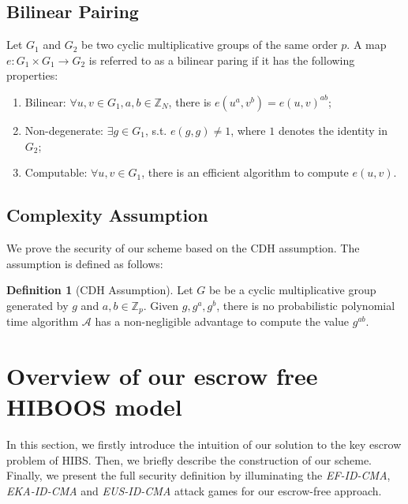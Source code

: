 \documentclass[times]{secauth}
\theoremstyle{definition}
\newtheorem{definition}[theorem]{Definition}
\theoremstyle{remark}
\begin{document}
\subsection{Bilinear Pairing}
Let $G_1$ and $G_2$ be two cyclic multiplicative groups of the same order $p$. 
A map $e: G_1 \times G_1 \rightarrow G_2$ is referred to as a bilinear paring if it has the following properties: 
\begin{enumerate}[1.]
\item Bilinear: $\forall u,v \in G_1, a,b \in \mathbb{Z}_N$, there is $e(u^a, v^b) = e(u,v)^{ab} $;
\item Non-degenerate: $\exists g \in G_1$, s.t. $e(g,g) \neq 1$, where $1$ denotes the identity in $G_2$;
\item Computable: $\forall u, v \in G_1$, there is an efficient algorithm to compute $e(u,v)$.
\end{enumerate}

\subsection{Complexity Assumption}
We prove the security of our scheme based on the CDH assumption. 
The assumption is defined as follows: 
\begin{definition}[CDH Assumption]
Let $G$ be be a cyclic multiplicative group generated by $g$ and $a, b \in \mathbb{Z}_p$.
Given $g, g^a, g^b$, there is no probabilistic polynomial time algorithm $\mathcal{A}$ has a non-negligible advantage to compute the value $g^{ab}$.
\end{definition}

\section{Overview of our escrow free HIBOOS model}\label{sec-overview}
In this section, we firstly introduce the intuition of our solution to the key escrow problem of HIBS. 
Then, we briefly describe the construction of our scheme. 
Finally, we present the full security definition by illuminating the \emph{EF-ID-CMA}, \emph{EKA-ID-CMA} and \emph{EUS-ID-CMA} attack games for our escrow-free approach.
\end{document}
